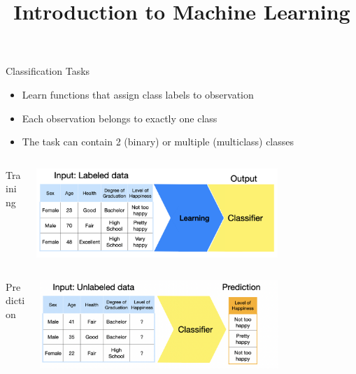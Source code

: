 \documentclass[11pt,compress,t,notes=noshow, xcolor=table]{beamer}
\title{Introduction to Machine Learning}
\date{}
\begin{document}
\sloppy

\begin{vbframe}{Classification Tasks}
\begin{itemize}
\item \small Learn functions that assign class labels to observation
\item \small Each observation belongs to exactly one class
\item \small The task can contain 2 (binary) or multiple (multiclass) classes
\end{itemize}


\begin{columns}  
\begin{column}{0.1\textwidth} 
\begin{center}
Training
\end{center}
\end{column}
\begin{column}{0.9\textwidth} 
\begin{center}
  \includegraphics[width = 0.75\textwidth]{slides/supervised-classification/figure_man/nutshell-classification-training-task.png}
\end{center}
\end{column}
\end{columns}
\begin{columns}
\begin{column}{0.1\textwidth} 
\begin{center}
Prediction
\end{center}
\end{column}
\begin{column}{0.9\textwidth} 
\begin{center}
  \includegraphics[width = 0.75\textwidth]{slides/supervised-classification/figure_man/nutshell-classification-prediction-task.png} 
\end{center}
\end{column}
\end{columns}
\end{vbframe}
\end{document}
